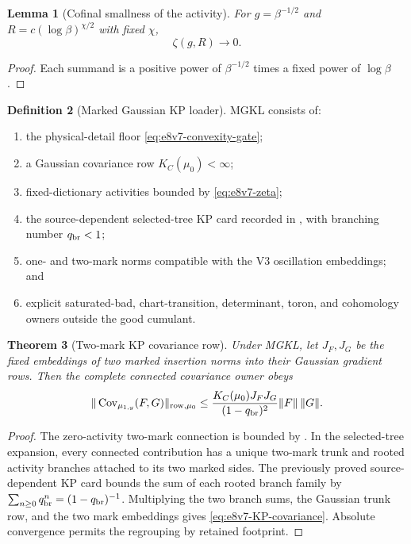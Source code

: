 \documentclass[11pt,oneside]{book}
\newtheorem{theorem}{Theorem}[chapter]
\newtheorem{lemma}[theorem]{Lemma}
\theoremstyle{definition}
\newtheorem{definition}[theorem]{Definition}
\theoremstyle{remark}
\begin{document}
\begin{lemma}[Cofinal smallness of the activity]
\label{lem:e8v7-zeta}
For \(g=\beta^{-1/2}\) and
\(R=c(\log\beta)^{\chi/2}\) with fixed \(\chi\),
\[
 \zeta(g,R)\longrightarrow0.                        \label{eq:e8v7-zeta-zero}
\]
\end{lemma}

\begin{proof}
Each summand is a positive power of \(\beta^{-1/2}\) times a fixed
power of \(\log\beta\).
\end{proof}

\begin{definition}[Marked Gaussian KP loader]
\label{def:e8v7-loader}
MGKL consists of:
\begin{enumerate}[label=\textup{(K\arabic*)},leftmargin=4em]
\item the physical-detail floor
      \eqref{eq:e8v7-convexity-gate};
\item a Gaussian covariance row \(K_C(\mu_0)<\infty\);
\item fixed-dictionary activities bounded by
      \eqref{eq:e8v7-zeta};
\item the source-dependent selected-tree KP card recorded in
      , with branching number
      \(q_{\rm br}<1\);
\item one- and two-mark norms compatible with the V3 oscillation
      embeddings; and
\item explicit saturated-bad, chart-transition, determinant, toron,
      and cohomology owners outside the good cumulant.
\end{enumerate}
\end{definition}

\begin{theorem}[Two-mark KP covariance row]
\label{thm:e8v7-KP-covariance}
Under MGKL, let \(J_F,J_G\) be the fixed embeddings of two marked
insertion norms into their Gaussian gradient rows.  Then the complete
connected covariance owner obeys
\[
 \|\operatorname{Cov}_{\mu_{1,y}}(F,G)\|_{{\rm row},\mu_0}
 \le
 \frac{K_C(\mu_0)J_FJ_G}{(1-q_{\rm br})^2}
 \|F\|\,\|G\|.                                      \label{eq:e8v7-KP-covariance}
\]
\end{theorem}

\begin{proof}
The zero-activity two-mark connection is bounded by
.  In the selected-tree expansion,
every connected contribution has a unique two-mark trunk and rooted
activity branches attached to its two marked sides.  The previously
proved source-dependent KP card bounds the sum of each rooted branch
family by
\(\sum_{n\ge0}q_{\rm br}^n=(1-q_{\rm br})^{-1}\).
Multiplying the two branch sums, the Gaussian trunk row, and the two
mark embeddings gives \eqref{eq:e8v7-KP-covariance}.  Absolute
convergence permits the regrouping by retained footprint.
\end{proof}
\end{document}

